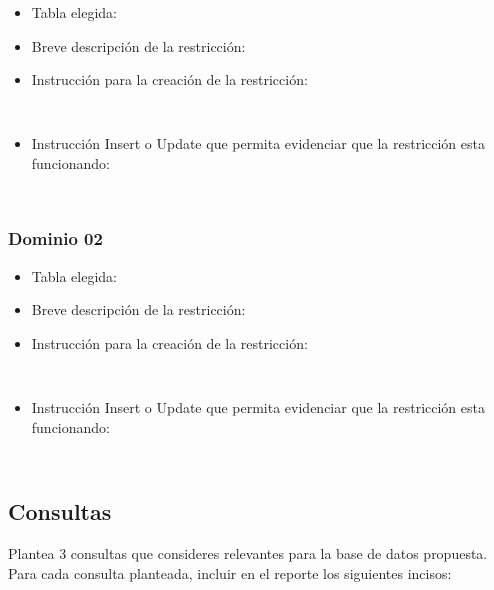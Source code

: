 \begin{itemize}
    \item Tabla elegida: 
    \item Breve descripción de la restricción: 
    \item Instrucción para la creación de la restricción:
        \begin{verbatim}
        
        \end{verbatim}

    \item Instrucción Insert o Update que permita evidenciar que la restricción esta funcionando:
    
        \begin{verbatim}
        
        \end{verbatim}  
\end{itemize}


\subsubsection*{Dominio 02}

\begin{itemize}
    \item Tabla elegida: 
    \item Breve descripción de la restricción: 
    \item Instrucción para la creación de la restricción:
        \begin{verbatim}
        
        \end{verbatim}

    \item Instrucción Insert o Update que permita evidenciar que la restricción esta funcionando:
    
        \begin{verbatim}
        
        \end{verbatim}  
\end{itemize}


\subsection{Consultas}

Plantea 3 consultas que consideres relevantes para la base de datos propuesta. Para cada consulta planteada, incluir en el reporte los siguientes incisos:



